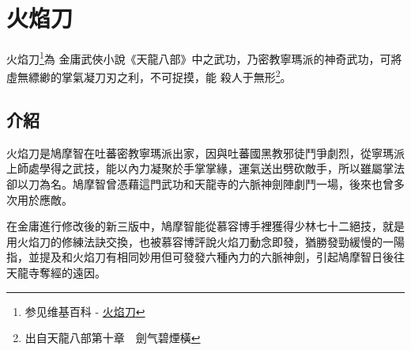 \chapter{火焰刀}
火焰刀\footnote{参见维基百科 - \href{http://zh.wikipedia.org/wiki/\%E7\%81\%AB\%E7\%84\%B0\%E5\%88\%80}{火焰刀}}為
金庸武俠小說《天龍八部》中之武功，乃密教寧瑪派的神奇武功，可將虛無縹緲的掌氣凝刀刃之利，不可捉摸，能
殺人于無形\footnote{出自天龍八部第十章　劍气碧煙橫}。

\section{介紹}

火焰刀是鳩摩智在吐蕃密教寧瑪派出家，因與吐蕃國黑教邪徒鬥爭劇烈，從寧瑪派上師處學得之武技，能以內力凝聚於手掌掌緣，運氣送出劈砍敵手，所以雖屬掌法卻以刀為名。鳩摩智曾憑藉這門武功和天龍寺的六脈神劍陣劇鬥一場，後來也曾多次用於應敵。

在金庸進行修改後的新三版中，鳩摩智能從慕容博手裡獲得少林七十二絕技，就是用火焰刀的修練法訣交換，也被慕容博評說火焰刀動念即發，猶勝發勁緩慢的一陽指，並提及和火焰刀有相同妙用但可發發六種內力的六脈神劍，引起鳩摩智日後往天龍寺奪經的遠因。

